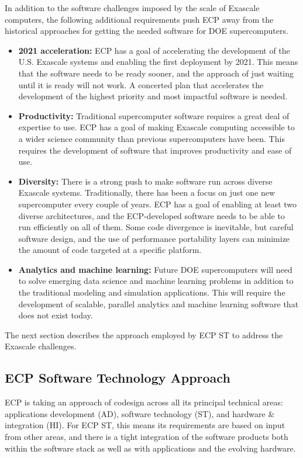 In addition to the software challenges imposed by the scale of Exascale computers, the following additional requirements push ECP away from the historical approaches for getting the needed software for DOE supercomputers.
\begin{itemize}
\item \textbf{2021 acceleration:} ECP has a goal of accelerating the development of the U.S. Exascale systems and enabling the first deployment by 2021. This means that the software needs to be ready sooner, and the approach of just waiting until it is ready will not work. A concerted plan that accelerates the development of the highest priority and most impactful software is needed.
\item \textbf{Productivity:} Traditional supercomputer software requires a great deal of expertise to use. ECP has a goal of making Exascale computing accessible to a wider science community than previous supercomputers have been. This requires the development of software that improves productivity and ease of use.
\item \textbf{Diversity:} There is a strong push to make software run across diverse Exascale systems. Traditionally, there has been a focus on just one new supercomputer every couple of years. ECP has a goal of enabling at least two diverse architectures, and the ECP-developed software needs to be able to run efficiently on all of them.  Some code divergence is inevitable, but careful software design, and the use of performance portability layers can minimize the amount of code targeted at a specific platform.
\item \textbf{Analytics and machine learning:} Future DOE supercomputers will need to solve emerging data science and machine learning problems in addition to the traditional modeling and simulation applications. This will require the development of scalable, parallel analytics and machine learning software that does not exist today.
\end{itemize}
 
The next section describes the approach employed by ECP ST to address the Exascale challenges.

\subsection{ECP Software Technology Approach}
ECP is taking an approach of codesign across all its principal technical areas: applications development (AD), software technology (ST), and hardware \& integration (HI). For ECP ST, this means its requirements are based on input from other areas, and there is a tight integration of the software products both within the software stack as well as with applications and the evolving hardware. 

